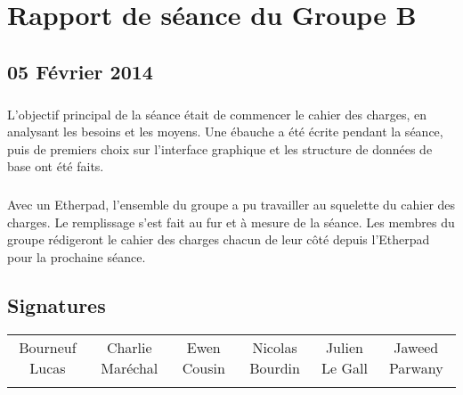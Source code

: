 
\newcommand{\titre}{Compte-rendu de séance}













\chapter*{Rapport de séance du Groupe B}	
\section*{05 Février 2014}
    	\paragraph*{}
		L'objectif principal de la séance était de commencer le cahier des charges, en analysant les besoins et les moyens.
		Une ébauche a été écrite pendant la séance, puis de premiers choix sur l'interface graphique et les structure de données de base ont été faits.
    	\paragraph*{}
		Avec un Etherpad, l'ensemble du groupe a pu travailler au squelette du cahier des charges. Le remplissage s'est fait au fur et à mesure de la séance.
		Les membres du groupe rédigeront le cahier des charges chacun de leur côté depuis l'Etherpad pour la prochaine séance.


\section*{Signatures}

    	\begin{tabular*}{0.75\textwidth}{c | c | c | c | c | c}
    	    Bourneuf Lucas & Charlie Maréchal & Ewen Cousin & Nicolas Bourdin & Julien Le Gall & Jaweed Parwany\\
     	     & & & & &
    	\end{tabular*}




